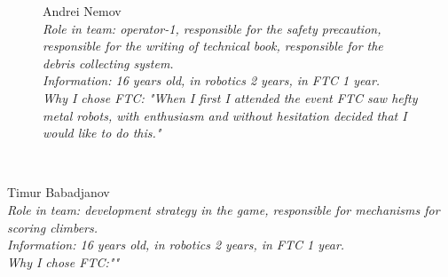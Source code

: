 \begin{figure}[H]
	\begin{minipage}{0.47\linewidth}
		Andrei Nemov\\
		\emph{Role in team: operator-1, responsible for the safety precaution, responsible for the writing of technical book, responsible for the debris collecting system. \\}
		\emph{Information: 16 years old, in robotics 2 years, in FTC 1 year. \\}
		\emph{Why I chose FTC: "When I first I attended the event FTC saw hefty metal robots, with enthusiasm and without hesitation decided that I would like to do this."}			
	\end{minipage}
	\hfill
	\begin{minipage}{0.47\linewidth}
		\\
	\end{minipage}	
\end{figure}
\vfill	
\begin{minipage}{0.47\linewidth}
\end{minipage}
\hfill
\begin{minipage}{0.47\linewidth}
	Timur Babadjanov\\
	\emph{Role in team: development strategy in the game, responsible for mechanisms for scoring climbers.\\ }
	\emph{Information: 16 years old, in robotics 2 years, in FTC 1 year. \\ } 
	\emph{Why I chose FTC:""}		
\end{minipage}

\fillpage


